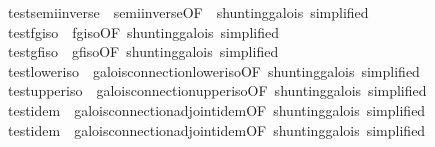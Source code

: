 \begin{isabellebody}
\ \ \ \ \ test{}semi{}inverse{}\ {}\ semi{}inverse{}{}OF\ {}\ shunting{}galois{}\ simplified{}\isanewline
\ \ \ \ \ test{}fg{}iso\ {}\ fg{}iso{}OF\ shunting{}galois{}\ simplified{}\isanewline
\ \ \ \ \ test{}gf{}iso\ {}\ gf{}iso{}OF\ shunting{}galois{}\ simplified{}\isanewline
\ \ \ \ \ test{}lower{}iso\ {}\ galois{}connection{}lower{}iso{}OF\ shunting{}galois{}\ simplified{}\isanewline
\ \ \ \ \ test{}upper{}iso\ {}\ galois{}connection{}upper{}iso{}OF\ shunting{}galois{}\ simplified{}\isanewline
\ \ \ \ \ test{}idem{}\ {}\ galois{}connection{}adjoint{}idem{}{}OF\ shunting{}galois{}\ simplified{}\isanewline
\ \ \ \ \ test{}idem{}\ {}\ galois{}connection{}adjoint{}idem{}{}OF\ shunting{}galois{}\ simplified{}\isanewline

\end{isabellebody}
